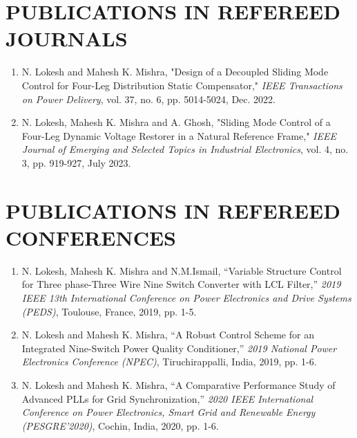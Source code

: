\vspace{-2.5cm}
\section*{PUBLICATIONS IN REFEREED JOURNALS}
%
\begin{enumerate}
%
\item N. Lokesh and Mahesh K. Mishra, "Design of a Decoupled Sliding Mode Control for Four-Leg Distribution Static Compensator," \textit{IEEE Transactions on Power Delivery}, vol. 37, no. 6, pp. 5014-5024, Dec. 2022. \vspace{-1.5cm}
\item N. Lokesh, Mahesh K. Mishra and A. Ghosh, "Sliding Mode Control of a Four-Leg Dynamic Voltage Restorer in a Natural Reference Frame," \textit{IEEE Journal of Emerging and Selected Topics in Industrial Electronics}, vol. 4, no. 3, pp. 919-927, July 2023. 
%
\end{enumerate}
%
\vspace{-3.5cm}
\section*{PUBLICATIONS IN REFEREED CONFERENCES}
%
\begin{enumerate}
%
\item N. Lokesh, Mahesh K. Mishra and N.M.Ismail, ``Variable Structure Control for Three phase-Three Wire Nine Switch Converter with LCL Filter,'' \textit{2019 IEEE 13th International Conference on Power Electronics and Drive Systems (PEDS)}, Toulouse, France, 2019, pp. 1-5. \vspace{-1.5cm}
%
\item N. Lokesh and Mahesh K. Mishra, ``A Robust Control Scheme for an Integrated Nine-Switch Power Quality Conditioner,'' \textit{2019 National Power Electronics Conference (NPEC)}, Tiruchirappalli, India, 2019, pp. 1-6. \vspace{-1.5cm}
%
\item N. Lokesh and Mahesh K. Mishra, ``A Comparative Performance Study of Advanced PLLs for Grid Synchronization,'' \textit{2020 IEEE International Conference on Power Electronics, Smart Grid and Renewable Energy (PESGRE’2020)}, Cochin, India, 2020, pp. 1-6.  %
%
%
\end{enumerate}
\vspace{4.5cm}
